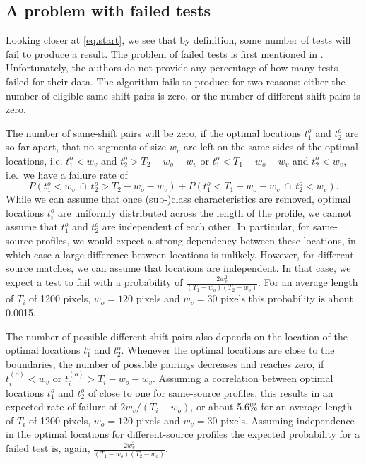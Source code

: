 \documentclass[12pt]{article}
\begin{document}
\subsection{A problem with failed
tests}\label{a-problem-with-failed-tests}

Looking closer at \autoref{eq.start}, we see that by definition, some
number of tests will fail to produce a result. The problem of failed
tests is first mentioned in \citet{afte-chumbley}. Unfortunately, the
authors do not provide any percentage of how many tests failed for their
data. The algorithm fails to produce for two reasons: either the number
of eligible same-shift pairs is zero, or the number of different-shift
pairs is zero.

The number of same-shift pairs will be zero, if the optimal locations
\(t_1^{o}\) and \(t_2^{o}\) are so far apart, that no segments of size
\(w_v\) are left on the same sides of the optimal locations, i.e.
\(t_1^{o} < w_v\) and \(t_2^{o} > T_2-w_o-w_v\) or
\(t_1^{o} < T_1- w_o - w_v\) and \(t_2^{o} < w_v\), i.e.~we have a
failure rate of \[
P\left( t_1^{o} < w_v \ \cap \ t_2^{o} > T_2-w_o-w_v\right) + P\left( t_1^{o} < T_1- w_o - w_v \ \cap \ t_2^{o} < w_v\right).
\] While we can assume that once (sub-)class characteristics are
removed, optimal locations \(t_i^{o}\) are uniformly distributed across
the length of the profile, we cannot assume that \(t_1^o\) and \(t_2^o\)
are independent of each other. In particular, for same-source profiles,
we would expect a strong dependency between these locations, in which
case a large difference between locations is unlikely. However, for
different-source matches, we can assume that locations are independent.
In that case, we expect a test to fail with a probability of
\(\frac{2 w_v^2}{(T_1-w_o)(T_2-w_o)}\). For an average length of \(T_i\)
of 1200 pixels, \(w_o = 120\) pixels and \(w_v = 30\) pixels this
probability is about 0.0015.

The number of possible different-shift pairs also depends on the
location of the optimal locations \(t_1^o\) and \(t_2^o\). Whenever the
optimal locations are close to the boundaries, the number of possible
pairings decreases and reaches zero, if \(t_i^{(o)} < w_v\) or
\(t_i^{(o)} > T_i-w_o- w_v\). Assuming a correlation between optimal
locations \(t_1^o\) and \(t_2^o\) of close to one for same-source
profiles, this results in an expected rate of failure of
\(2 w_v / (T_i-w_o)\), or about 5.6\% for an average length of \(T_i\)
of 1200 pixels, \(w_o = 120\) pixels and \(w_v = 30\) pixels. Assuming
independence in the optimal locations for different-source profiles the
expected probability for a failed test is, again,
\(\frac{2 w_v^2}{(T_1-w_o)(T_2-w_o)}\).
\end{document}
